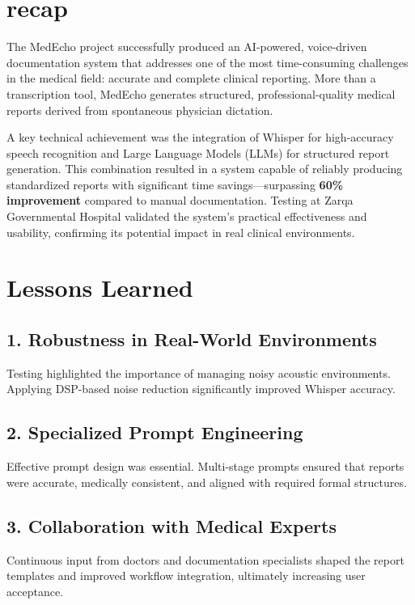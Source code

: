 


\section{recap}
\label{sec:conclusion:recap}
The MedEcho project successfully produced an AI-powered, voice-driven documentation system that addresses one of the most time-consuming challenges in the medical field: accurate and complete clinical reporting. More than a transcription tool, MedEcho generates structured, professional-quality medical reports derived from spontaneous physician dictation.

A key technical achievement was the integration of Whisper for high-accuracy speech recognition and Large Language Models (LLMs) for structured report generation. This combination resulted in a system capable of reliably producing standardized reports with significant time savings—surpassing \textbf{60\% improvement} compared to manual documentation. Testing at Zarqa Governmental Hospital validated the system’s practical effectiveness and usability, confirming its potential impact in real clinical environments.

\section{Lessons Learned}
\label{sec:conclusion:lessons}
\subsection*{1. Robustness in Real-World Environments}
Testing highlighted the importance of managing noisy acoustic environments.  
Applying DSP-based noise reduction significantly improved Whisper accuracy.

\subsection*{2. Specialized Prompt Engineering}
Effective prompt design was essential. Multi-stage prompts ensured that reports were accurate, medically consistent, and aligned with required formal structures.

\subsection*{3. Collaboration with Medical Experts}
Continuous input from doctors and documentation specialists shaped the report templates and improved workflow integration, ultimately increasing user acceptance.

